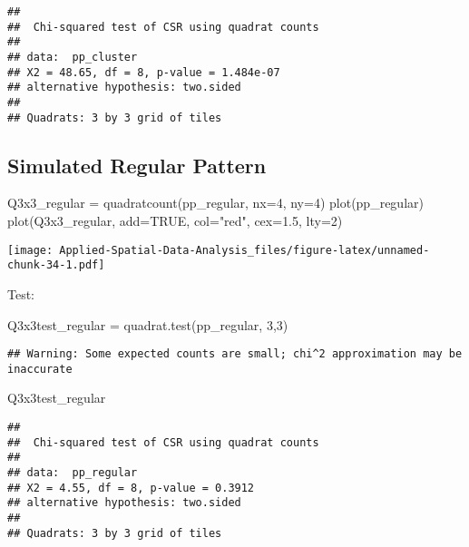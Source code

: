 \documentclass[
]{book}
\newenvironment{Shaded}{\begin{snugshade}}{\end{snugshade}}
\newcommand{\AttributeTok}[1]{\textcolor[rgb]{0.77,0.63,0.00}{#1}}
\newcommand{\ConstantTok}[1]{\textcolor[rgb]{0.00,0.00,0.00}{#1}}
\newcommand{\DecValTok}[1]{\textcolor[rgb]{0.00,0.00,0.81}{#1}}
\newcommand{\FloatTok}[1]{\textcolor[rgb]{0.00,0.00,0.81}{#1}}
\newcommand{\FunctionTok}[1]{\textcolor[rgb]{0.00,0.00,0.00}{#1}}
\newcommand{\NormalTok}[1]{#1}
\newcommand{\OtherTok}[1]{\textcolor[rgb]{0.56,0.35,0.01}{#1}}
\newcommand{\StringTok}[1]{\textcolor[rgb]{0.31,0.60,0.02}{#1}}
\begin{document}
\begin{verbatim}
## 
##  Chi-squared test of CSR using quadrat counts
## 
## data:  pp_cluster
## X2 = 48.65, df = 8, p-value = 1.484e-07
## alternative hypothesis: two.sided
## 
## Quadrats: 3 by 3 grid of tiles
\end{verbatim}

\hypertarget{simulated-regular-pattern}{%
\subsection{Simulated Regular Pattern}\label{simulated-regular-pattern}}

\begin{Shaded}
\begin{Highlighting}[]
\NormalTok{Q3x3\_regular }\OtherTok{=} \FunctionTok{quadratcount}\NormalTok{(pp\_regular, }\AttributeTok{nx=}\DecValTok{4}\NormalTok{, }\AttributeTok{ny=}\DecValTok{4}\NormalTok{)}
\FunctionTok{plot}\NormalTok{(pp\_regular)}
\FunctionTok{plot}\NormalTok{(Q3x3\_regular, }\AttributeTok{add=}\ConstantTok{TRUE}\NormalTok{, }\AttributeTok{col=}\StringTok{"red"}\NormalTok{, }\AttributeTok{cex=}\FloatTok{1.5}\NormalTok{, }\AttributeTok{lty=}\DecValTok{2}\NormalTok{)}
\end{Highlighting}
\end{Shaded}

\texttt{[image: Applied-Spatial-Data-Analysis\_files/figure-latex/unnamed-chunk-34-1.pdf]}

Test:

\begin{Shaded}
\begin{Highlighting}[]
\NormalTok{Q3x3test\_regular }\OtherTok{=} \FunctionTok{quadrat.test}\NormalTok{(pp\_regular, }\DecValTok{3}\NormalTok{,}\DecValTok{3}\NormalTok{)}
\end{Highlighting}
\end{Shaded}

\begin{verbatim}
## Warning: Some expected counts are small; chi^2 approximation may be inaccurate
\end{verbatim}

\begin{Shaded}
\begin{Highlighting}[]
\NormalTok{Q3x3test\_regular}
\end{Highlighting}
\end{Shaded}

\begin{verbatim}
## 
##  Chi-squared test of CSR using quadrat counts
## 
## data:  pp_regular
## X2 = 4.55, df = 8, p-value = 0.3912
## alternative hypothesis: two.sided
## 
## Quadrats: 3 by 3 grid of tiles
\end{verbatim}
\end{document}
